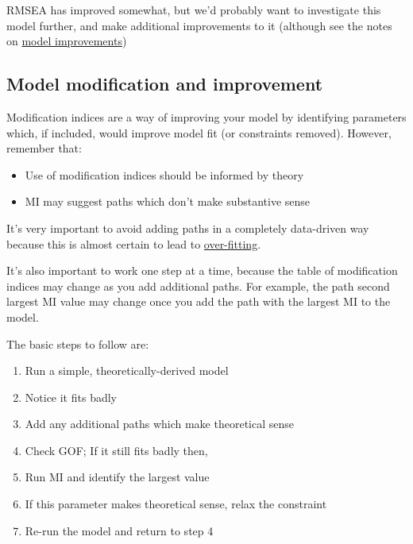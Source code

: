 \documentclass[]{article}
\providecommand{\tightlist}{%
  \setlength{\itemsep}{0pt}\setlength{\parskip}{0pt}}
\theoremstyle{definition}
\theoremstyle{definition}
\theoremstyle{definition}
\theoremstyle{remark}
\begin{document}
RMSEA has improved somewhat, but we'd probably want to investigate this
model further, and make additional improvements to it (although see the
notes on \protect\hyperlink{model-improvement}{model improvements})

\hypertarget{model-improvement}{\subsection*{Model modification and
improvement}\label{model-improvement}}

Modification indices are a way of improving your model by identifying
parameters which, if included, would improve model fit (or constraints
removed). However, remember that:

\begin{itemize}
\tightlist
\item
  Use of modification indices should be informed by theory
\item
  MI may suggest paths which don't make substantive sense
\end{itemize}

{It's very important to avoid adding paths in a completely data-driven
way because this is almost certain to lead to
\protect\hyperlink{over-fitting}{over-fitting}.}

It's also important to work one step at a time, because the table of
modification indices may change as you add additional paths. For
example, the path second largest MI value may change once you add the
path with the largest MI to the model.

The basic steps to follow are:

\begin{enumerate}
\def\labelenumi{\arabic{enumi}.}
\tightlist
\item
  Run a simple, theoretically-derived model
\item
  Notice it fits badly
\item
  Add any additional paths which make theoretical sense
\item
  Check GOF; If it still fits badly then,
\item
  Run MI and identify the largest value
\item
  If this parameter makes theoretical sense, relax the constraint
\item
  Re-run the model and return to step 4
\end{enumerate}
\end{document}
